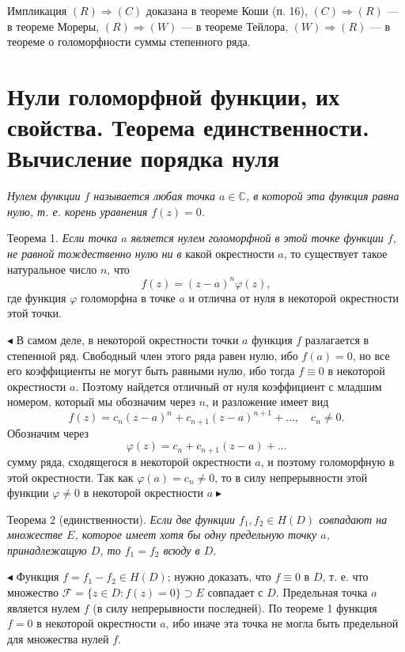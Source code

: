 \documentclass[12pt, a4paper]{article}
\theoremstyle{definition}
\theoremstyle{remark}
\begin{document}
Импликация $(R) \Rightarrow (C)$ доказана в теореме Коши (п. 16), $(C) \Rightarrow (R)$ — в теореме Мореры, $(R) \Rightarrow (W)$ — в теореме Тейлора, $(W) \Rightarrow (R)$ — в теореме о голоморфности суммы степенного ряда.

\newpage
\section{Нули голоморфной функции, их свойства. Теорема единственности. Вычисление порядка нуля}
\textit{Нулем функции $f$ называется любая точка $a \in \mathbb{C}$, в которой эта функция равна нулю, т. е. корень уравнения $f(z) = 0$.}

Теорема 1. \textit{Если точка $a$ является нулем голоморфной в этой точке функции $f$, не равной тождественно нулю ни в} какой окрестности $a$, то существует такое натуральное число $n$, что
\begin{equation}
	f(z) = (z - a)^n \varphi(z),
	\tag{1}
\end{equation}
где функция $\varphi$ голоморфна в точке $a$ и отлична от нуля в некоторой окрестности этой точки.

$\blacktriangleleft$ В самом деле, в некоторой окрестности точки $a$ функция $f$ разлагается в степенной ряд. Свободный член этого ряда равен нулю, ибо $f(a) = 0$, но все его коэффициенты не могут быть равными нулю, ибо тогда $f \equiv 0$ в некоторой окрестности $a$. Поэтому найдется отличный от нуля коэффициент с младшим номером, который мы обозначим через $n$, и разложение имеет вид
\begin{equation}
	f(z) = c_n (z - a)^n + c_{n+1} (z - a)^{n+1} + \dots, \quad c_n \neq 0.
	\tag{2}
\end{equation}
Обозначим через
$$
\varphi(z) = c_n + c_{n+1} (z - a) + \dots
$$
сумму ряда, сходящегося в некоторой окрестности $a$, и поэтому голоморфную в этой окрестности. Так как $\varphi(a) = c_n \neq 0$, то в силу непрерывности этой функции $\varphi \neq 0$ в некоторой окрестности $a \blacktriangleright$

Теорема 2 (единственности). \textit{Если две функции $f_1, f_2 \in H(D)$ совпадают на множестве $E$, которое имеет хотя бы одну предельную точку $a$, принадлежащую $D$, то $f_1 = f_2$ всюду в $D$.}

$\blacktriangleleft$ Функция $f = f_1 - f_2 \in H(D)$; нужно доказать, что $f \equiv 0$ в $D$, т. е. что множество $\mathcal{F} = \{z \in D : f(z) = 0\} \supset E$ совпадает с $D$. Предельная точка $a$ является нулем $f$ (в силу непрерывности последней). По теореме 1 функция $f = 0$ в некоторой окрестности $a$, ибо иначе эта точка не могла быть предельной для множества нулей $f$.
\end{document}
